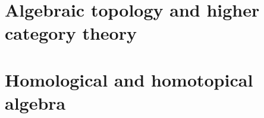     \begin{appendices}
        \chapter{Algebraic topology and higher category theory}
            \begin{abstract}
                
            \end{abstract}
            
            \minitoc
            
            
            
            
            
        \chapter{Homological and homotopical algebra}
            \begin{abstract}
                
            \end{abstract}
            
            \minitoc
            
            

    \end{appendices}
	
	\printbibliography


